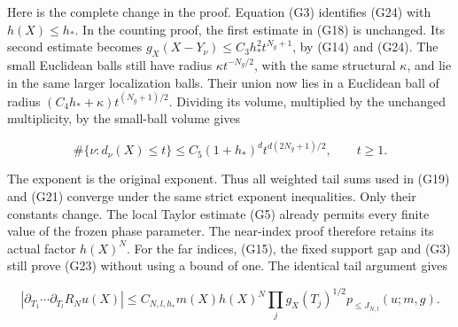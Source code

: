 \documentclass[
  11pt,
]{article}
\begin{document}
Here is the complete change in the proof. Equation (G3) identifies (G24)
with \(h(X)\leq h_*\). In the counting proof, the first estimate in
(G18) is unchanged. Its second estimate becomes
\(g_X(X-Y_\nu)\leq C_3h_*^2t^{N_g+1}\), by (G14) and (G24). The small
Euclidean balls still have radius \(\kappa t^{-N_g/2}\), with the same
structural \(\kappa\), and lie in the same larger localization balls.
Their union now lies in a Euclidean ball of radius
\((C_4h_*+\kappa)t^{(N_g+1)/2}\). Dividing its volume, multiplied by the
unchanged multiplicity, by the small-ball volume gives

\[
 \#\{\nu:d_\nu(X)\leq t\}
 \leq C_5(1+h_*)^d t^{d(2N_g+1)/2},\qquad t\geq1.
 \tag{G25}
\]

The exponent is the original exponent. Thus all weighted tail sums used
in (G19) and (G21) converge under the same strict exponent inequalities.
Only their constants change. The local Taylor estimate (G5) already
permits every finite value of the frozen phase parameter. The near-index
proof therefore retains its actual factor \(h(X)^N\). For the far
indices, (G15), the fixed support gap and (G3) still prove (G23) without
using a bound of one. The identical tail argument gives

\[
 |\partial_{T_1}\cdots\partial_{T_l}R_Nu(X)|
 \leq C_{N,l,h_*}m(X)h(X)^N
       \prod_j g_X(T_j)^{1/2}p_{\leq J_{N,l}}(u;m,g).
 \tag{G26}
\]
\end{document}

